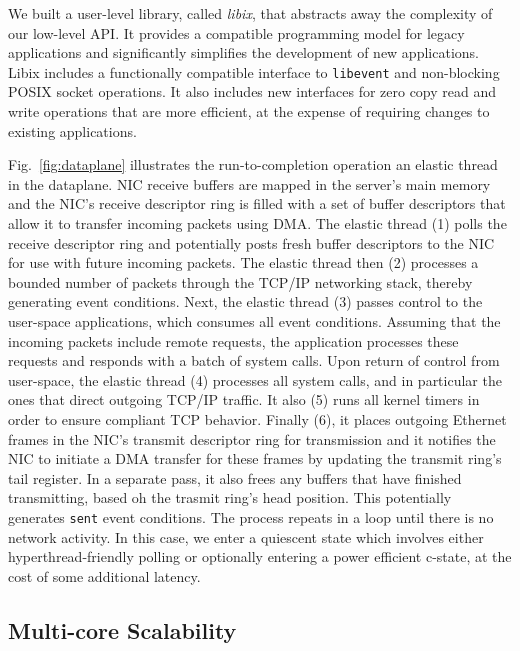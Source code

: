 We built a user-level library, called \emph{libix}, that abstracts away
the complexity of our low-level API. It provides a compatible programming
model for legacy applications and significantly simplifies the
development of new applications. Libix includes a functionally
compatible interface to \texttt{libevent} and non-blocking POSIX
socket operations. It also includes new interfaces for zero copy read
and write operations that are more efficient, at the expense of
requiring changes to existing applications. 


% 

Fig.~\ref{fig:dataplane} illustrates the run-to-completion
operation an elastic thread in the \ix dataplane. NIC receive buffers are mapped in the
server's main memory and the NIC's receive descriptor ring is filled with a set of buffer descriptors
that allow it to transfer incoming packets using DMA\@.  The
elastic thread (1) polls the receive descriptor ring and
potentially posts fresh buffer descriptors to the NIC for use with
future incoming packets. The elastic thread then (2) processes a bounded
number of packets through the TCP/IP networking stack, thereby
generating event conditions. Next, the elastic thread (3) passes
control to the user-space applications, which consumes all event
conditions. Assuming that the incoming packets include remote
requests, the application processes these requests and responds with a
batch of system calls. Upon return of control from user-space, the
elastic thread (4) processes all system calls, and in particular the
ones that direct outgoing TCP/IP traffic. It also (5) runs all kernel
timers in order to ensure compliant TCP behavior. Finally (6), it places
outgoing Ethernet frames in the NIC's transmit descriptor ring for
transmission and it notifies the NIC to initiate a DMA transfer
for these frames by updating the transmit ring's tail register. In
a separate pass, it also frees any buffers that have finished transmitting, based
oh the trasmit ring's head position. This potentially generates \texttt{sent} event conditions.
The process repeats in a loop until there is no network activity. In this
case, we enter a quiescent state which involves either hyperthread-friendly
polling or optionally entering a power efficient c-state, at the cost of
some additional latency.


\subsection{Multi-core Scalability}
\label{sec:impl:cohfree}

